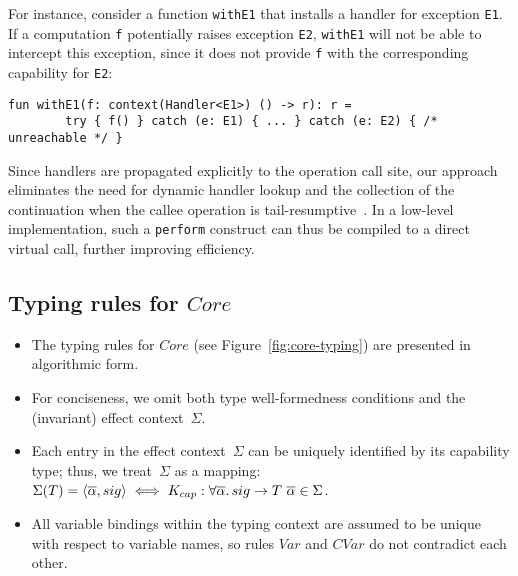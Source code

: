 \documentclass[acmsmall,review,screen]{acmart}
\newcommand{\ap}{~}
\begin{document}
For instance, consider a function \lstinline[language=colang]{withE1} that installs a handler for exception \lstinline[language=colang]{E1}.
If a computation \lstinline[language=colang]{f} potentially raises exception \lstinline[language=colang]{E2}, \lstinline[language=colang]{withE1} will not be able to intercept this exception, since it does not provide \lstinline[language=colang]{f} with the corresponding capability for \lstinline[language=colang]{E2}:
\begin{lstlisting}[language=colang]
    fun withE1(f: context(Handler<E1>) () -> r): r =
        try { f() } catch (e: E1) { ... } catch (e: E2) { /* unreachable */ }
\end{lstlisting}

Since handlers are propagated explicitly to the operation call site, our approach eliminates the need for dynamic handler lookup and the collection of the continuation when the callee operation is tail-resumptive~\cite{xie2020effect}.
In a low-level implementation, such a \lstinline[language=colang]{perform} construct can thus be compiled to a direct virtual call, further improving efficiency.

\subsection{Typing rules for $Core$} \label{subsec:core-typing}

\begin{itemize}
    \item The typing rules for $Core$ (see Figure~\ref{fig:core-typing}) are presented in algorithmic form.
    \item For conciseness, we omit both type well-formedness conditions and the (invariant) effect context~$\Sigma$.
    \item Each entry in the effect context~$\Sigma$ can be uniquely identified by its capability type; thus, we treat~$\Sigma$ as a mapping: $\Sigma(T) = \left< \overline{\alpha}, sig \right> \iff K_{cap} : \forall\overline{\alpha}\ldotp sig\to T\ap\overline{\alpha}\in\Sigma$.
    \item All variable bindings within the typing context are assumed to be unique with respect to variable names, so rules $Var$ and $CVar$ do not contradict each other.
\end{itemize}
\end{document}
